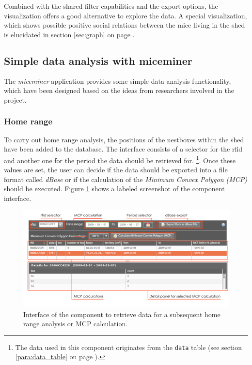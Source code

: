 Combined with the shared filter capabilities and the export options, the visualization offers a good alternative to explore the data. A special visualization, which shows possible positive social relations between the mice living in the shed is elucidated in section \ref{sec:graph} on page \pageref{sec:graph}.

\subsection{Simple data analysis with miceminer}
\label{subsec:data_ana} 

The \textit{miceminer} application provides some simple data analysis functionality, which have been designed based on the ideas from researchers involved in the project.

\subsubsection{Home range}
\label{subsubsec:homerangedata}

To carry out home range analysis, the positions of the nestboxes within the shed have been added to the database. The interface consists of a selector for the rfid and another one for the period the data should be retrieved for. \footnote{The data used in this component originates from the \lstinline|data| table (see section \ref{para:data_table} on page \pageref{para:data_table}).}. Once these values are set, the user can decide if the data should be exported into a file format called \textit{dBase} or if the calculation of the \textit{Minimum Convex Polygon (MCP)} should be executed. Figure \ref{fig:home_range} shows a labeled screenshot of the component interface.

\begin{figure}[htpb]
\begin{center}
  \includegraphics[width=.75\textwidth]{assets/pdf/home_range.pdf}
  \caption[Home range component interface]{Interface of the component to retrieve data for a subsequent home range analysis or MCP calculation.}
  \label{fig:home_range}
\end{center}
\end{figure}

